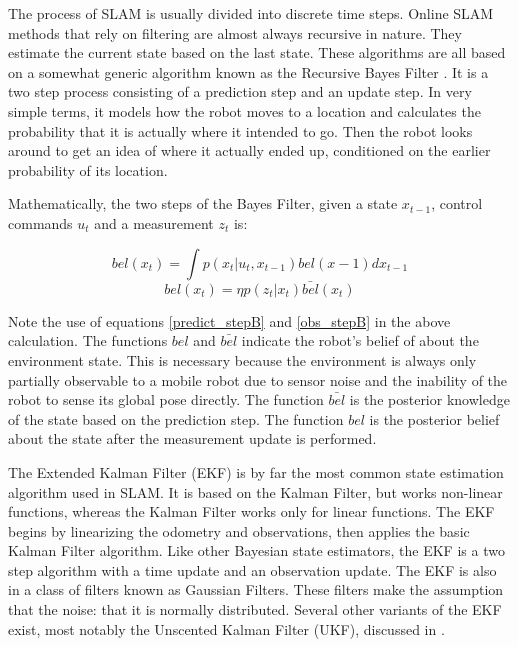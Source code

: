 \documentclass[12pt]{article}
\begin{document}
The process of SLAM is usually divided into discrete time steps.  Online SLAM methods that rely on filtering are almost always recursive in nature.  They estimate the current state based on the last state.  These algorithms are all based on a somewhat generic algorithm known as the Recursive Bayes Filter \cite{ThrunPR2005} \cite{diard2003survey}.  It is a two step process consisting of a prediction step and an update step.  In very simple terms, it models how the robot moves to a location and calculates the probability that it is actually where it intended to go.  Then the robot looks around to get an idea of where it actually ended up, conditioned on the earlier probability of its location.

Mathematically, the two steps of the Bayes Filter, given a state $x_{t-1}$, control commands $u_t$ and a measurement $z_t$ is:

\begin{equation}\label{ekf_predict}
bel(x_t) = \int p(x_t| u_t,x_{t-1}) bel(x-1)dx_{t-1}     
\end{equation}
\begin{equation}\label{ekf_measure}
bel(x_t) =η p(z_t|x_t)\bar{bel}(x_t)                           
\end{equation}

Note the use of equations \ref{predict_stepB} and \ref{obs_stepB} in the above calculation.  The functions $bel$ and $\bar{bel}$ indicate the robot's belief of about the environment state.  This is necessary because the environment is always only partially observable to a mobile robot due to sensor noise and the inability of the robot to sense its global pose directly.  The function $\bar{bel}$ is the posterior knowledge of the state based on the prediction step.  The function $bel$ is the posterior belief about the state after the measurement update is performed.

The Extended Kalman Filter (EKF) is by far the most common state estimation algorithm used in SLAM.  It is based on the Kalman Filter, but works non-linear functions, whereas the Kalman Filter works only for linear functions. The EKF begins by linearizing the odometry and observations, then applies the basic Kalman Filter algorithm.  Like other Bayesian state estimators, the EKF is a two step algorithm with a time update and an observation update. The EKF is also in a class of filters known as Gaussian Filters.  These filters make the assumption that the noise: that it is normally distributed.  Several other variants of the EKF exist, most notably the Unscented Kalman Filter (UKF), discussed in \cite{UKF}.
\end{document}
